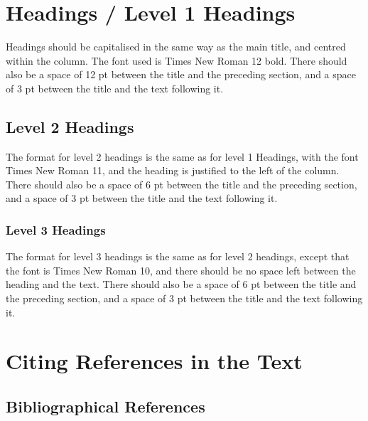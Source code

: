 \documentclass[10pt, a4paper]{article}
\begin{document}
\section{Headings / Level 1 Headings}

Headings should be capitalised in the same way as the main title, and centred
within the column. The font used is Times New Roman 12 bold. There should
also be a space of 12 pt between the title and the preceding section, and
a space of 3 pt between the title and the text following it.

\subsection{Level 2 Headings}

The format for level 2 headings is the same as for level 1 Headings, with the
font Times New Roman 11, and the heading is justified to the left of the column.
There should also be a space of 6 pt between the title and the preceding
section, and a space of 3 pt between the title and the text following it.

\subsubsection{Level 3 Headings}

The format for level 3 headings is the same as for level 2 headings, except that
the font is Times New Roman 10, and there should be no space left between the
heading and the text. There should also be a space of 6 pt between the title and
the preceding section, and a space of 3 pt between the title and the text
following it.

%

\section{Citing References in the Text}

\subsection{Bibliographical References}
\end{document}
